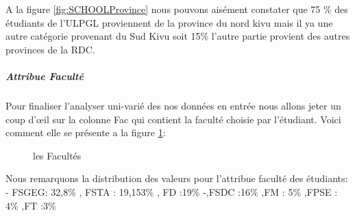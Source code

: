 A la figure \ref{fig:SCHOOLProvince} nous pouvons aisément constater que 75 \% des étudiants
de l'\ac{ULPGL} proviennent de la province du nord kivu mais il ya une autre
catégorie provenant  du Sud Kivu soit 15\% l'autre partie provient des autres provinces de la \ac{RDC}.
\subparagraph{Attribue Faculté}
Pour finaliser l'analyser uni-varié des nos données en entrée nous allons jeter un coup d'œil sur la colonne Fac qui contient la faculté choisie par l'étudiant.
Voici comment elle se présente a la figure \ref{fig:FAC}:
\begin{figure}[!htbp]
	\centering
	\caption[Short caption]{les Facultés }
	\label{fig:FAC}
\end{figure}
 Nous remarquons la distribution des valeurs pour
l'attribue faculté des étudiants: - FSGEG: 32,8\% , FSTA : 19,153\% , FD
:19\% -,FSDC :16\% ,FM : 5\% ,FPSE : 4\% ,FT :3\%
